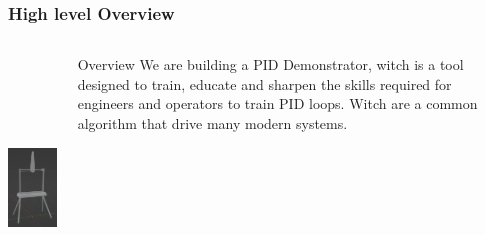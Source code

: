 \documentclass[aspectratio=169]{beamer}
\begin{document}
\begin{frame}
    \frametitle{High level Overview}

    \begin{columns}
        \begin{column}{0.48\textwidth}
            \includegraphics[height=7cm]{Full}
        \end{column}

        \begin{column}{0.48\textwidth}
            \begin{block}{Overview}
                We are building a PID Demonstrator, witch is a tool designed
                to train, educate and sharpen the skills required for engineers
                and operators to train PID loops. Witch are a common algorithm
                that drive many modern systems.
            \end{block}
        \end{column}
    \end{columns}

\end{frame}
\end{document}
